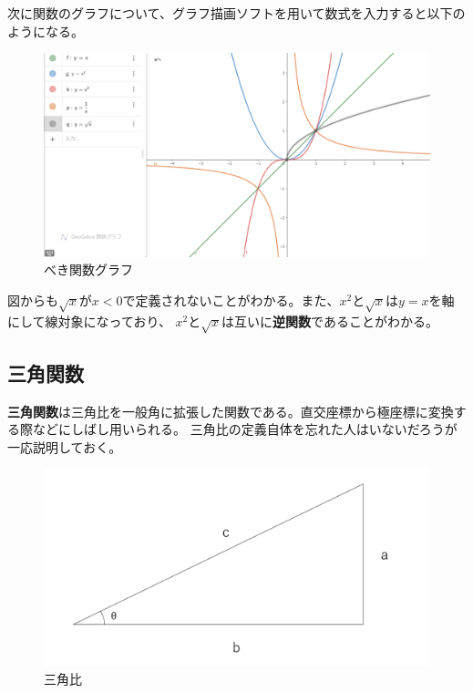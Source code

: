 \documentclass[a4j,dvipdfmx]{jsarticle}
\begin{document}
                次に関数のグラフについて、グラフ描画ソフトを用いて数式を入力すると以下のようになる。
                \begin{figure}[h]
                    \centering
                    \includegraphics[keepaspectratio,scale=0.5]{img/QuuNote/PowerFuncGraph.png}
                    \caption{べき関数グラフ}
                \end{figure}

                図からも$\sqrt{x}$が$x<0$で定義されないことがわかる。また、$x^2$と$\sqrt{x}$は$y=x$を軸にして線対象になっており、
                $x^2$と$\sqrt{x}$は互いに\textbf{逆関数}であることがわかる。
            \clearpage
            \subsection{三角関数}
                \textbf{三角関数}は三角比を一般角に拡張した関数である。直交座標から極座標に変換する際などにしばし用いられる。
                三角比の定義自体を忘れた人はいないだろうが一応説明しておく。
                \begin{figure}[h]
                    \centering
                    \includegraphics[keepaspectratio,scale=0.3]{img/QuuNote/triangleFunc.png}
                    \caption{三角比}
                \end{figure}
\end{document}
